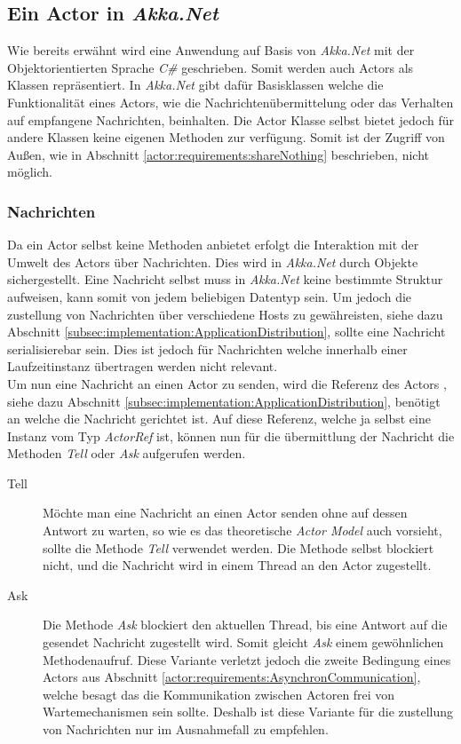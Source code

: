 \subsection{Ein Actor in \textit{Akka.Net}}
Wie bereits erwähnt wird eine Anwendung auf Basis von \textit{Akka.Net} mit der Objektorientierten Sprache \textit{C\#} geschrieben. Somit werden auch Actors als Klassen repräsentiert. In \textit{Akka.Net} gibt dafür Basisklassen welche die Funktionalität eines Actors, wie die Nachrichtenübermittelung oder das Verhalten auf empfangene Nachrichten, beinhalten. Die Actor Klasse selbst bietet jedoch für andere Klassen keine eigenen Methoden zur verfügung. Somit ist der Zugriff von Außen, wie in Abschnitt \ref{actor:requirements:shareNothing} beschrieben, nicht möglich. \\

\subsubsection{Nachrichten}\label{subsec:implementation:akkaMessaging}
Da ein Actor selbst keine Methoden anbietet erfolgt die Interaktion mit der Umwelt des Actors über Nachrichten. Dies wird in \textit{Akka.Net} durch Objekte sichergestellt. Eine Nachricht selbst muss in \textit{Akka.Net} keine bestimmte Struktur aufweisen, kann somit von jedem beliebigen Datentyp sein. Um jedoch die zustellung von Nachrichten über verschiedene Hosts zu gewähreisten, siehe dazu Abschnitt \ref{subsec:implementation:ApplicationDistribution}, sollte eine Nachricht serialisierebar sein. Dies ist jedoch für Nachrichten welche innerhalb einer Laufzeitinstanz übertragen werden nicht relevant. \\
Um nun eine Nachricht an einen Actor zu senden, wird die Referenz des Actors , siehe dazu Abschnitt \ref{subsec:implementation:ApplicationDistribution}, benötigt an welche die Nachricht gerichtet ist. Auf diese Referenz, welche ja selbst eine Instanz vom Typ \textit{ActorRef} ist, können nun für die übermittlung der Nachricht die Methoden \textit{Tell} oder \textit{Ask} aufgerufen werden.
\begin{description}
    \item[Tell] Möchte man eine Nachricht an einen Actor senden ohne auf dessen Antwort zu warten, so wie es das theoretische \textit{Actor Model} auch vorsieht, sollte die Methode \textit{Tell} verwendet werden. Die Methode selbst blockiert nicht, und die Nachricht wird in einem Thread an den Actor zugestellt. 
    \item[Ask] Die Methode \textit{Ask} blockiert den aktuellen Thread, bis eine Antwort auf die gesendet Nachricht zugestellt wird. Somit gleicht \textit{Ask} einem gewöhnlichen Methodenaufruf. Diese Variante verletzt jedoch die zweite Bedingung eines Actors aus Abschnitt \ref{actor:requirements:AsynchronCommunication}, welche besagt das die Kommunikation zwischen Actoren frei von Wartemechanismen sein sollte. Deshalb ist diese Variante für die zustellung von Nachrichten nur im Ausnahmefall zu empfehlen.  
\end{description}

